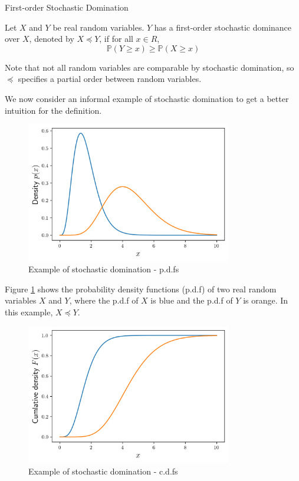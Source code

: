 \begin{definition}
	First-order Stochastic Domination

	\noindent
	Let $X$ and $Y$ be real random variables. $Y$ has a first-order stochastic dominance over $X$, denoted by $X \preceq Y$, if for all $x \in R$, 
	$$
		\mathbb{P}(Y \geq x) \geq \mathbb{P}(X \geq x)
	$$
\end{definition}

Note that not all random variables are comparable by stochastic domination, so $\preceq$ specifies a partial order between random variables. %

We now consider an informal example of stochastic domination to get a better intuition for the definition.

\begin{figure}[h]
	\centering
	\includegraphics[width=0.8\textwidth]{./figures/stochastic_domination_pdf.png}
	\caption{Example of stochastic domination - p.d.fs}
	\label{fig:stochDomPDFs}
\end{figure}

Figure \ref{fig:stochDomPDFs} shows the probability density functions (p.d.f) of two real random variables $X$ and $Y$, where the p.d.f of $X$ is blue and the p.d.f of $Y$ is orange. In this example, $X \preceq Y$.

\begin{figure}[h]
	\centering
	\includegraphics[width=0.8\textwidth]{./figures/stochastic_domination_cdf.png}
	\caption{Example of stochastic domination - c.d.fs}
	\label{fig:stochDomCDFs}
\end{figure}

